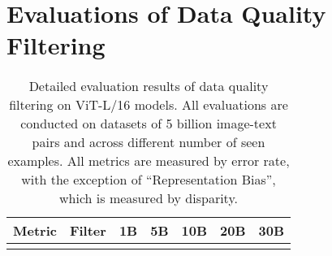 \section{Evaluations of Data Quality Filtering}
\label{appendix:quality_filter}

{\footnotesize

\begin{longtable}{l|l|rrrrr}
\caption{Detailed evaluation results of data quality filtering on ViT-L/16 models. All evaluations are conducted on datasets of 5 billion image-text pairs and across different number of seen examples. All metrics are measured by error rate, with the exception of ``Representation Bias'', which is measured by disparity.}
\label{tab:quality_filter_all} \\

\toprule
Metric & Filter & 1B & 5B & 10B & 20B & 30B \\ 
\midrule
\endfirsthead  %

\endhead  %

\endfoot  %

\bottomrule
\endlastfoot %


\end{longtable}}

